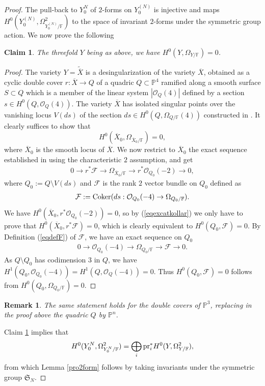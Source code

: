 \documentclass[10pt]{article}
\newtheorem{claim}[theo]{Claim}
\newtheorem{rema}[theo]{Remark}
\begin{document}
\begin{proof} The pull-back to $Y^{N}_0$ of $2$-forms on $Y^{(N)}_0$ is injective and maps $H^0(Y^{(N)}_0,\Omega_{Y^{(N)}_0/\mathbb{F}}^2)$ to the space of invariant $2$-forms under the symmetric group action. We now prove the following
\begin{claim}\label{claim1forms} The threefold $Y$ being as above, we have  $H^0(Y,\Omega_{Y/\mathbb{F}})=0$.
\end{claim}
\begin{proof} The variety $Y=\widetilde{\overline{X}}$ is a desingularization of the variety $\overline{X}$, obtained as  a cyclic double cover $r: \overline{X}\rightarrow Q$ of a quadric $Q\subset \mathbb{P}^4$ ramified along a smooth surface $S\subset Q$ which is a member of the linear system $|\mathcal{O}_Q(4)|$ defined by a section $s\in H^0(Q,\mathcal{O}_Q(4))$.
The variety $\overline{X}$ has isolated singular points over the vanishing locus $V(ds)$ of the section $ds\in H^0(Q,\Omega_{Q/\mathbb{F}}(4))$ constructed in \cite[Definition-Lemma V.5.4]{kollarbook}. It clearly suffices to show that
$$H^0(\overline{X}_0,\Omega_{\overline{X}_0/\mathbb{F}})=0,$$
where $ \overline{X}_0$ is the smooth locus of $\overline{X}$.
 We now restrict to
$ \overline{X}_0$ the exact sequence  established in \cite[Lemma V.5.5]{kollarbook} using  the characteristic $2$ assumption,  and get
\begin{eqnarray}\label{eqexcatkollar} 0\rightarrow r^*\mathcal{F}\rightarrow \Omega_{\overline{X}_0/\mathbb{F}}\rightarrow r^*\mathcal{O}_{Q_0}(-2)\rightarrow 0,
\end{eqnarray}
where $Q_0:=Q\setminus V(ds)$ and $\mathcal{F}$ is the rank $2$ vector bundle on $Q_0$ defined as
\begin{eqnarray}\label{eqdefF} \mathcal{F}:={\rm Coker}(ds: \mathcal{O}_{Q_0}(-4)\rightarrow\Omega_{Q_0/\mathbb{F}}).\end{eqnarray}
We have $H^0(\overline{X}_0,r^*\mathcal{O}_{Q_0}(-2))=0$, so by (\ref{eqexcatkollar})  we only have to prove that $H^0(\overline{X}_0,r^*\mathcal{F})=0$, which is clearly equivalent to $H^0(Q_0,\mathcal{F})=0$.
By Definition (\ref{eqdefF}) of $\mathcal{F}$, we have an exact sequence on $Q_0$
\begin{eqnarray}\label{eqexcatkollarF} 0\rightarrow \mathcal{O}_{Q_0}(-4)\rightarrow \Omega_{Q_0/\mathbb{F}}\rightarrow \mathcal{F}\rightarrow 0.
\end{eqnarray}
As $Q\setminus Q_0$ has codimension $3$ in $Q$, we have $H^1(Q_0,\mathcal{O}_{Q_0}(-4))=H^1(Q,\mathcal{O}_{Q}(-4))=0$. Thus $H^0(Q_0,\mathcal{F})=0$ follows from $H^0(Q_0,\Omega_{Q_0/\mathbb{F}})=0$.
\end{proof}
\begin{rema}\label{rema3pourdouble}{\rm The same statement holds for the double covers of $\mathbb{P}^3$,  replacing in the proof above the quadric $Q$ by $\mathbb{P}^n$.}
\end{rema}
Claim \ref{claim1forms} implies  that
$$H^0(Y^{N}_0,\Omega_{Y^{N}_0/\mathbb{F}}^2)=\bigoplus_{i}{\rm pr}_i^*H^0(Y,\Omega_{Y/\mathbb{F}}^2),$$
from which Lemma \ref{pro2form} follows by taking invariants under the symmetric group $\mathfrak{S}_N$.
\end{proof}
\end{document}

